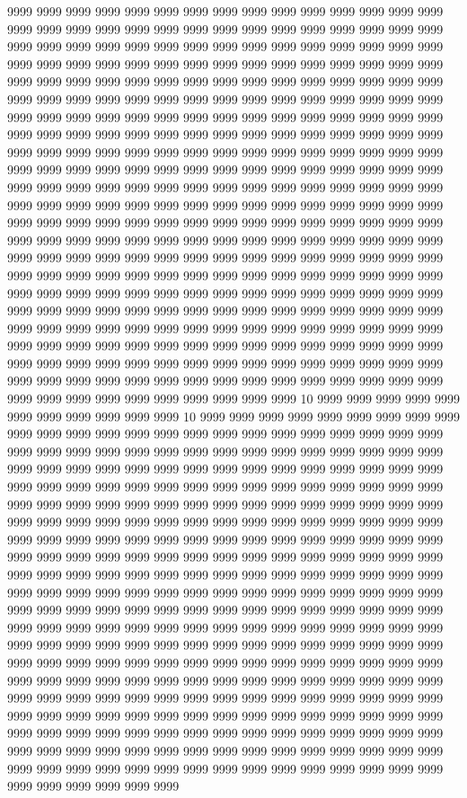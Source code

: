 9999 9999 9999 9999 9999 9999 9999 9999 9999 9999 9999 9999 9999 9999 9999 9999 9999 9999 9999 9999 9999 9999 9999 9999 9999 9999 9999 9999 9999 9999 9999 9999 9999 9999 9999 9999 9999 9999 9999 9999 9999 9999 9999 9999 9999 9999 9999 9999 9999 9999 9999 9999 9999 9999 9999 9999 9999 9999 9999 9999 9999 9999 9999 9999 9999 9999 9999 9999 9999 9999 9999 9999 9999 9999 9999 9999 9999 9999 9999 9999 9999 9999 9999 9999 9999 9999 9999 9999 9999 9999 9999 9999 9999 9999 9999 9999 9999 9999 9999 9999 9999 9999 9999 9999 9999 9999 9999 9999 9999 9999 9999 9999 9999 9999 9999 9999 9999 9999 9999 9999 9999 9999 9999 9999 9999 9999 9999 9999 9999 9999 9999 9999 9999 9999 9999 9999 9999 9999 9999 9999 9999 9999 9999 9999 9999 9999 9999 9999 9999 9999 9999 9999 9999 9999 9999 9999 9999 9999 9999 9999 9999 9999 9999 9999 9999 9999 9999 9999 9999 9999 9999 9999 9999 9999 9999 9999 9999 9999 9999 9999 9999 9999 9999 9999 9999 9999 9999 9999 9999 9999 9999 9999 9999 9999 9999 9999 9999 9999 9999 9999 9999 9999 9999 9999 9999 9999 9999 9999 9999 9999 9999 9999 9999 9999 9999 9999 9999 9999 9999 9999 9999 9999 9999 9999 9999 9999 9999 9999 9999 9999 9999 9999 9999 9999 9999 9999 9999 9999 9999 9999 9999 9999 9999 9999 9999 9999 9999 9999 9999 9999 9999 9999 9999 9999 9999 9999 9999 9999 9999 9999 9999 9999 9999 9999 9999 9999 9999 9999 9999 9999 9999 9999 9999 9999 9999 9999 9999 9999 9999 9999 9999 9999 9999 9999 9999 9999 9999 9999 9999 9999 9999 9999 9999 9999 9999 9999 9999 9999 9999 9999 9999 9999 9999 9999 9999 9999 9999 9999 9999 9999 9999 9999 9999 9999 9999 9999 9999 9999 9999 9999 9999 9999 9999 9999 9999 9999 9999 9999 9999 9999 9999 9999 9999 9999 9999 9999 9999 9999 9999 9999 10 9999 9999 9999 9999 9999 9999 9999 9999 9999 9999 9999 10 9999 9999 9999 9999 9999 9999 9999 9999 9999 9999 9999 9999 9999 9999 9999 9999 9999 9999 9999 9999 9999 9999 9999 9999 9999 9999 9999 9999 9999 9999 9999 9999 9999 9999 9999 9999 9999 9999 9999 9999 9999 9999 9999 9999 9999 9999 9999 9999 9999 9999 9999 9999 9999 9999 9999 9999 9999 9999 9999 9999 9999 9999 9999 9999 9999 9999 9999 9999 9999 9999 9999 9999 9999 9999 9999 9999 9999 9999 9999 9999 9999 9999 9999 9999 9999 9999 9999 9999 9999 9999 9999 9999 9999 9999 9999 9999 9999 9999 9999 9999 9999 9999 9999 9999 9999 9999 9999 9999 9999 9999 9999 9999 9999 9999 9999 9999 9999 9999 9999 9999 9999 9999 9999 9999 9999 9999 9999 9999 9999 9999 9999 9999 9999 9999 9999 9999 9999 9999 9999 9999 9999 9999 9999 9999 9999 9999 9999 9999 9999 9999 9999 9999 9999 9999 9999 9999 9999 9999 9999 9999 9999 9999 9999 9999 9999 9999 9999 9999 9999 9999 9999 9999 9999 9999 9999 9999 9999 9999 9999 9999 9999 9999 9999 9999 9999 9999 9999 9999 9999 9999 9999 9999 9999 9999 9999 9999 9999 9999 9999 9999 9999 9999 9999 9999 9999 9999 9999 9999 9999 9999 9999 9999 9999 9999 9999 9999 9999 9999 9999 9999 9999 9999 9999 9999 9999 9999 9999 9999 9999 9999 9999 9999 9999 9999 9999 9999 9999 9999 9999 9999 9999 9999 9999 9999 9999 9999 9999 9999 9999 9999 9999 9999 9999 9999 9999 9999 9999 9999 9999 9999 9999 9999 9999 9999 9999 9999 9999 9999 9999 9999 9999 9999 9999 9999 9999 9999 9999 9999 9999 9999 9999 9999 9999 9999 9999 9999 9999 9999 9999 9999 9999 9999 9999 9999 9999 9999 9999 9999 9999 9999 9999 9999 9999 9999 9999 9999 9999 9999 9999 9999 9999 9999 9999 9999 9999 